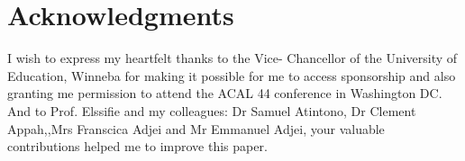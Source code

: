 \documentclass[output=paper
,newtxmath
,modfonts
,nonflat]{langsci/langscibook}
\begin{document}
\section*{Acknowledgments}
I wish to express my heartfelt thanks to the Vice- Chancellor of the University of Education, Winneba for making it possible for me to access sponsorship and also granting me permission to attend the ACAL 44 conference in Washington DC. And to Prof. Elssifie and my colleagues: Dr Samuel Atintono, Dr Clement Appah,,Mrs Franscica Adjei and Mr Emmanuel Adjei, your valuable contributions helped me to improve this paper.
 




\begin{comment}
\begin{verbatim}

Anash, Mercy. (2003). The function of \isi{tone} in \ili{Late} Grammar. In M.E.Kropp Dakubu and E.K.Osam, (eds.), Studies of the languages of the Volta Basin 1. 197-203

Caesar, Regina O. (2012). Negation in \ili{Dangme}. In Selected proceedings of the 41st annual conference on African linguistics. Bruce Connel and Nickolas Rolle, eds. 18-28. Sommeville, MA: Cascadilla Proceedings Project.

Dahl, Osten. (1979). Typology of sentence \isi{negation}. Linguistics, 17. Moulton Publishers. 97-106.



\end{verbatim}
\end{comment}

\sloppy
\printbibliography[heading=subbibliography,notkeyword=this]
\end{document}
